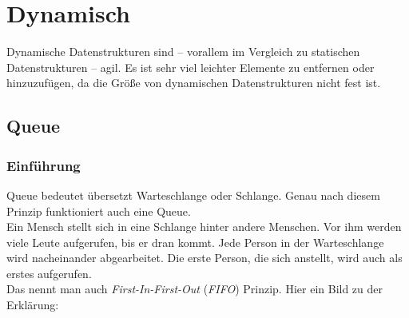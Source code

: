 \section{Dynamisch}
\begin{flushleft}   
    Dynamische Datenstrukturen sind -- vorallem im Vergleich zu statischen Datenstrukturen -- agil.
    Es ist sehr viel leichter Elemente zu entfernen oder hinzuzufügen, da die Größe von dynamischen Datenstrukturen nicht fest ist.
\end{flushleft}

\subsection{Queue}
\subsubsection{Einführung}

\begin{flushleft}   
    Queue bedeutet übersetzt Warteschlange oder Schlange.
    Genau nach diesem Prinzip funktioniert auch eine Queue. \\
    Ein Mensch stellt sich in eine Schlange hinter andere Menschen.
    Vor ihm werden viele Leute aufgerufen, bis er dran kommt.
    Jede Person in der Warteschlange wird nacheinander abgearbeitet.
    Die erste Person, die sich anstellt, wird auch als erstes aufgerufen. \\
    Das nennt man auch \textit{First-In-First-Out} (\textit{FIFO}) Prinzip.
    Hier ein Bild zu der Erklärung:
\end{flushleft}

\begin{center}
\end{center}

